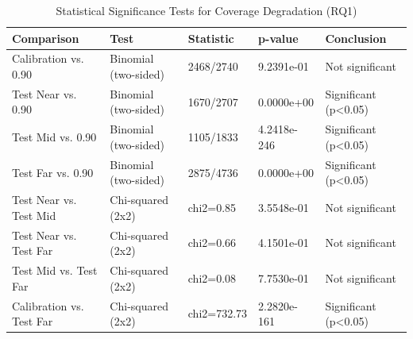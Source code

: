 \begin{table}
\caption{Statistical Significance Tests for Coverage Degradation (RQ1)}
\label{tab:t4_4_significance}
\begin{tabular}{lllll}
\toprule
Comparison & Test & Statistic & p-value & Conclusion \\
\midrule
Calibration vs. 0.90 & Binomial (two-sided) & 2468/2740 & 9.2391e-01 & Not significant \\
Test Near vs. 0.90 & Binomial (two-sided) & 1670/2707 & 0.0000e+00 & Significant (p<0.05) \\
Test Mid vs. 0.90 & Binomial (two-sided) & 1105/1833 & 4.2418e-246 & Significant (p<0.05) \\
Test Far vs. 0.90 & Binomial (two-sided) & 2875/4736 & 0.0000e+00 & Significant (p<0.05) \\
Test Near vs. Test Mid & Chi-squared (2x2) & chi2=0.85 & 3.5548e-01 & Not significant \\
Test Near vs. Test Far & Chi-squared (2x2) & chi2=0.66 & 4.1501e-01 & Not significant \\
Test Mid vs. Test Far & Chi-squared (2x2) & chi2=0.08 & 7.7530e-01 & Not significant \\
Calibration vs. Test Far & Chi-squared (2x2) & chi2=732.73 & 2.2820e-161 & Significant (p<0.05) \\
\bottomrule
\end{tabular}
\end{table}
